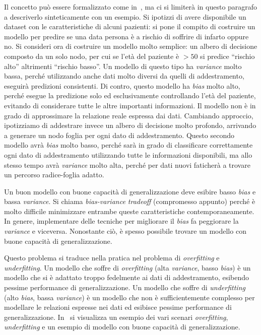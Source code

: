 Il concetto può essere formalizzato come in~\cite{elements-of-statistical-learning}, ma ci si limiterà in questo paragrafo a descriverlo sinteticamente con un esempio.
Si ipotizzi di avere disponibile un dataset con le caratteristiche di alcuni pazienti: si pone il compito di costruire un modello per predire se una data persona è a rischio di soffrire di infarto oppure no.
Si consideri ora di costruire un modello molto semplice: un albero di decisione composto da un solo nodo, per cui se l'età del paziente è $>50$ si predice ``rischio alto'' altrimenti ``rischio basso''.
Un modello di questo tipo ha \emph{variance} molto bassa, perché utilizzando anche dati molto diversi da quelli di addestramento, eseguirà predizioni consistenti.
Di contro, questo modello ha \emph{bias} molto alto, perché esegue la predizione solo ed esclusivamente controllando l'età del paziente, evitando di considerare tutte le altre importanti informazioni. 
Il modello non è in grado di approssimare la relazione reale espressa dai dati.
Cambiando approccio, ipotizziamo di addestrare invece un albero di decisione molto profondo, arrivando a generare un nodo foglia per ogni dato di addestramento.
Questo secondo modello avrà \emph{bias} molto basso, perché sarà in grado di classificare correttamente ogni dato di addestramento utilizzando tutte le informazioni disponibili, ma allo stesso tempo avrà \emph{variance} molto alta, perché per dati nuovi faticherà a trovare un percorso radice-foglia adatto.

Un buon modello con buone capacità di generalizzazione deve esibire basso \emph{bias} e bassa \emph{variance}. Si chiama \emph{bias-variance tradeoff} (compromesso appunto) perché è molto difficile minimizzare entrambe queste caratteristiche contemporaneamente. In genere, implementare delle tecniche per migliorare il \emph{bias} fa peggiorare la \emph{variance} e viceversa.
Nonostante ciò, è spesso possibile trovare un modello con buone capacità di generalizzazione. 

Questo problema si traduce nella pratica nel problema di \emph{overfitting} e \emph{underfitting}.
Un modello che soffre di \emph{overfitting} (alta \emph{variance}, basso \emph{bias}) è un modello che si è adattato troppo fedelmente ai dati di addestramento, esibendo pessime performance di generalizzazione. 
Un modello che soffre di \emph{underfitting} (alto \emph{bias}, bassa \emph{variance}) è un modello che non è sufficientemente complesso per modellare le relazioni espresse nei dati ed esibisce pessime performance di generalizzazione.
In~ si visualizza un esempio dei vari scenari \emph{overfitting}, \emph{underfitting} e un esempio di modello con buone capacità di generalizzazione.